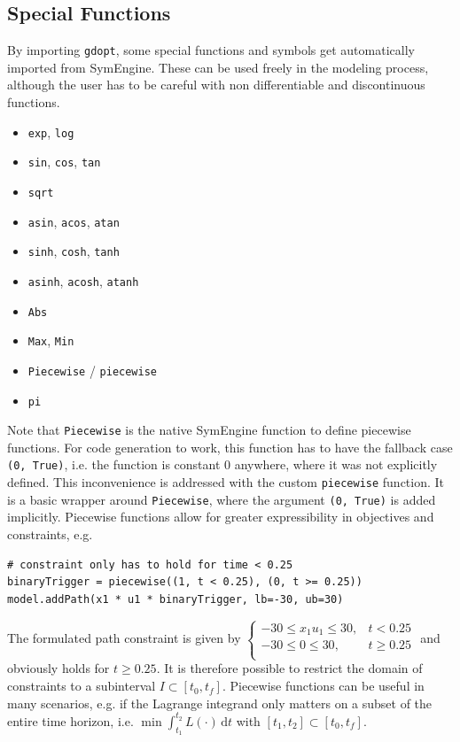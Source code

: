 \documentclass[12pt]{article}
\newcommand{\dd}{\mathrm{d}}
\begin{document}
\subsection{Special Functions}
\label{c:specialFunction}
By importing \texttt{gdopt}, some special functions and symbols
get automatically imported from SymEngine. These can be used freely in the
modeling process, although the user has to be careful with non differentiable
and discontinuous functions.
\begin{itemize}
	\item \texttt{exp}, \texttt{log}
	\item \texttt{sin}, \texttt{cos}, \texttt{tan}
	\item \texttt{sqrt}
	\item \texttt{asin}, \texttt{acos}, \texttt{atan}
	\item \texttt{sinh}, \texttt{cosh}, \texttt{tanh}
	\item \texttt{asinh}, \texttt{acosh}, \texttt{atanh}
	\item \texttt{Abs}
	\item \texttt{Max}, \texttt{Min}
	\item \texttt{Piecewise} / \texttt{piecewise}
	\item \texttt{pi}
\end{itemize}

Note that \texttt{Piecewise} is the native SymEngine function to define
piecewise functions. For code generation to work, this function has to have the fallback
case \texttt{(0, True)}, i.e. the function is constant $0$ anywhere, where it
was not explicitly defined. This inconvenience is addressed with the custom
\texttt{piecewise} function. It is a basic wrapper around \texttt{Piecewise},
where the argument \texttt{(0, True)} is added implicitly. Piecewise functions
allow for greater expressibility in objectives and constraints, e.g.

\begin{lstlisting}
# constraint only has to hold for time < 0.25
binaryTrigger = piecewise((1, t < 0.25), (0, t >= 0.25))
model.addPath(x1 * u1 * binaryTrigger, lb=-30, ub=30) 
\end{lstlisting}

The formulated path constraint is given by
$\begin{cases}
		-30 \leq x_1  u_1 \leq 30, & t < 0.25    \\
		-30 \leq 0 \leq 30,        & t \geq 0.25 \\
	\end{cases}$
and obviously holds for $t \geq 0.25$. It is therefore possible to restrict the
domain of constraints to a subinterval $I \subset [t_0, t_f]$. Piecewise
functions can be useful in many scenarios, e.g. if the Lagrange integrand only
matters on a subset of the entire time horizon, i.e. $\min \int_{t_1}^{t_2}
	L(\cdot) \, \dd t$ with $[t_1, t_2] \subset [t_0, t_f]$.
\end{document}
